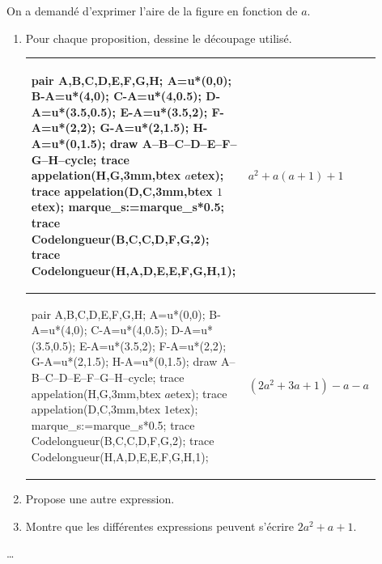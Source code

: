 \begin{exercice*}
    On a demandé d'exprimer l'aire de la figure en fonction de $a$.
    \begin{enumerate}
        \item Pour chaque proposition, dessine le découpage utilisé.
              \begin{center}
                  \begin{tabular}{|>{\centering\arraybackslash}m{0.55\linewidth}|>{\centering\arraybackslash}m{0.35\linewidth}|}
                      \hline
                      \begin{Geometrie}[Cadre="aucun"]
                          pair A,B,C,D,E,F,G,H;
                          A=u*(0,0);
                          B-A=u*(4,0);
                          C-A=u*(4,0.5);
                          D-A=u*(3.5,0.5);
                          E-A=u*(3.5,2);
                          F-A=u*(2,2);
                          G-A=u*(2,1.5);
                          H-A=u*(0,1.5);
                          draw A--B--C--D--E--F--G--H--cycle;
                          trace appelation(H,G,3mm,btex $a$etex);
                          trace appelation(D,C,3mm,btex $1$etex);
                          marque_s:=marque_s*0.5;
                          trace Codelongueur(B,C,C,D,F,G,2);
                          trace Codelongueur(H,A,D,E,E,F,G,H,1);
                      \end{Geometrie}
                       &
                      {\small $a^2+a(a+1)+1$}    \\
                      \hline
                      \begin{Geometrie}[Cadre="aucun"]
                          pair A,B,C,D,E,F,G,H;
                          A=u*(0,0);
                          B-A=u*(4,0);
                          C-A=u*(4,0.5);
                          D-A=u*(3.5,0.5);
                          E-A=u*(3.5,2);
                          F-A=u*(2,2);
                          G-A=u*(2,1.5);
                          H-A=u*(0,1.5);
                          draw A--B--C--D--E--F--G--H--cycle;
                          trace appelation(H,G,3mm,btex $a$etex);
                          trace appelation(D,C,3mm,btex $1$etex);
                          marque_s:=marque_s*0.5;
                          trace Codelongueur(B,C,C,D,F,G,2);
                          trace Codelongueur(H,A,D,E,E,F,G,H,1);
                      \end{Geometrie}
                       &
                      {\small$(2a^2+3a+1)-a-a$} \\
                      \hline
                  \end{tabular}
              \end{center}

              \medskip
        \item Propose une autre expression.
        \item Montre que les différentes expressions peuvent s'écrire $2a^2 + a + 1$.
    \end{enumerate}
\end{exercice*}
\begin{corrige}
    \dots
\end{corrige}

